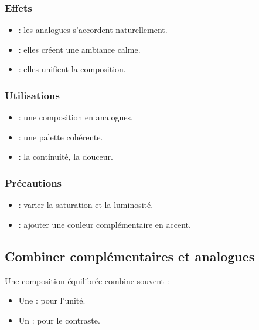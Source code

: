 \subsubsection{Effets}

\begin{itemize}
    \item {} : les analogues s'accordent naturellement.
    \item {} : elles créent une ambiance calme.
    \item {} : elles unifient la composition.
\end{itemize}

\subsubsection{Utilisations}

\begin{itemize}
    \item {} : une composition en analogues.
    \item {} : une palette cohérente.
    \item {} : la continuité, la douceur.
\end{itemize}

\subsubsection{Précautions}

\begin{itemize}
    \item {} : varier la saturation et la luminosité.
    \item {} : ajouter une couleur complémentaire en accent.
\end{itemize}

\subsection{Combiner complémentaires et analogues}

Une composition équilibrée combine souvent :

\begin{itemize}
    \item Une  : pour l'unité.
    \item Un  : pour le contraste.
\end{itemize}

